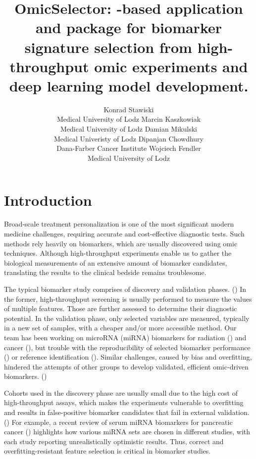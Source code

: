 \documentclass[article]{jss}
\author{Konrad Stawiski\\ Medical University of Lodz
\And Marcin Kaszkowiak\\Medical University of Lodz
\And Damian Mikulski\\Medical Univeristy of Lodz
\AND Dipanjan Chowdhury\\Dana-Farber Cancer Institute
\And Wojciech Fendler\\Medical University of Lodz}
\title{OmicSelector: \proglang{Docker}-based application and \proglang{R} package for biomarker signature selection from high-throughput omic experiments and deep learning model development.}
\begin{document}


\section[Introduction]{Introduction} \label{sec:intro}

Broad-scale treatment personalization is one of the most significant modern medicine challenges, requiring accurate and cost-effective diagnostic tests. Such methods rely heavily on biomarkers, which are usually discovered using omic techniques. Although high-throughput experiments enable us to gather the biological measurements of an extensive amount of biomarker candidates, translating the results to the clinical bedside remains troublesome.

The typical biomarker study comprises of discovery and validation phases. (\cite{Goossens2015}) In the former, high-throughput screening is usually performed to measure the values of multiple features. Those are further assessed to determine their diagnostic potential. In the validation phase, only selected variables are measured, typically in a new set of samples, with a cheaper and/or more accessible method.
Our team has been working on microRNA (miRNA) biomarkers for radiation (\cite{Dinh2016b}) and cancer (\cite{Elias2017c}), but trouble with the reproducibility of selected biomarker performance (\cite{Acharya2015,Fendler2017,Maachowska2020}) or reference identification (\cite{Pagacz2020}). Similar challenges, caused by bias and overfitting, hindered the attempts of other groups to develop validated, efficient omic-driven biomarkers. (\cite{Dobbin2016})

Cohorts used in the discovery phase are usually small due to the high cost of high-throughput assays, which makes the experiments vulnerable to overfitting and results in false-positive biomarker candidates that fail in external validation. (\cite{Smialowski2009}) For example, a recent review of serum miRNA biomarkers for pancreatic cancer (\cite{Xue2019}) highlights how various miRNA sets are chosen in different studies, with each study reporting unrealistically optimistic results. Thus, correct and overfitting-resistant feature selection is critical in biomarker studies.
\end{document}
